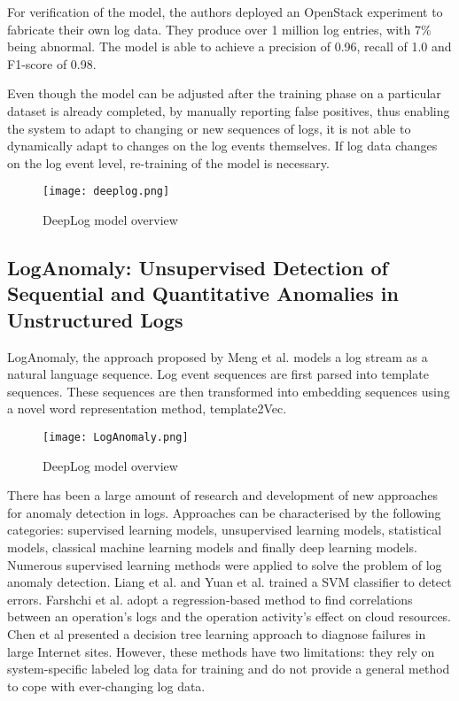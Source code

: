For verification of the model, the authors deployed an OpenStack experiment to fabricate their own log data. They produce over 1 million log entries, with 7\% being abnormal. The model is able to achieve a precision of 0.96, recall of 1.0 and F1-score of 0.98.

Even though the model can be adjusted after the training phase on a particular dataset is already completed, by manually reporting false positives, thus enabling the system to adapt to changing or new sequences of logs, it is not able to dynamically adapt to changes on the log events themselves. If log data changes on the log event level, re-training of the model is necessary.

\begin{figure}[h]
  \centering
  \texttt{[image: deeplog.png]}\\
  \caption{DeepLog model overview \cite{graves2013speech}}
  \label{fig:deeplog}
\end{figure}


\subsection{LogAnomaly: Unsupervised Detection of Sequential and Quantitative Anomalies in Unstructured Logs}
LogAnomaly, the approach proposed by Meng et al. \cite{meng2019loganomaly} models a log stream as a natural language sequence. Log event sequences are first parsed into template sequences. These sequences are then transformed into embedding sequences using a novel word representation method, template2Vec.

\begin{figure}[h]
  \centering
  \texttt{[image: LogAnomaly.png]}\\
  \caption{DeepLog model overview \cite{graves2013speech}}
  \label{fig:deeplog}
\end{figure}

There has been a large amount of research and development of new approaches for anomaly detection in logs. %
Approaches can be characterised by the following categories: supervised learning models, unsupervised learning models, statistical models, classical machine learning models and finally deep learning models.
Numerous supervised learning methods were applied to solve the problem of log anomaly detection. Liang et al. \cite{liang2007failure} and Yuan et al. \cite{yuan2006automated} trained a SVM classifier to detect errors. Farshchi et al. \cite{farshchi2015anomaly} adopt a regression-based method to find correlations between an operation's logs and the operation activity's effect on cloud resources. Chen et al \cite{chen2004failure} presented a decision tree learning approach to diagnose failures in large Internet sites. However, these methods have two limitations: they rely on system-specific labeled log data for training and do not provide a general method to cope with ever-changing log data.

